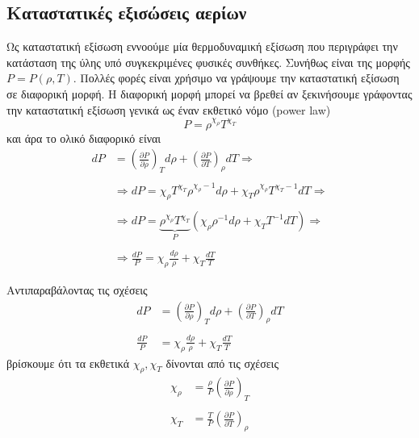 \subsection{Καταστατικές εξισώσεις αερίων}
Ως καταστατική εξίσωση εννοούμε μία θερμοδυναμική εξίσωση που περιγράφει την κατάσταση της ύλης υπό συγκεκριμένες φυσικές συνθήκες. Συνήθως είναι της μορφής $P = P(\rho, T)$. Πολλές φορές είναι χρήσιμο να γράψουμε την καταστατική εξίσωση σε διαφορική μορφή. Η διαφορική μορφή μπορεί να βρεθεί αν ξεκινήσουμε γράφοντας την καταστατική εξίσωση γενικά ως έναν εκθετικό νόμο (power law)
\begin{equation}
    P = \rho^{\chi_\rho} T^{\chi_T}
\end{equation}
και άρα το ολικό διαφορικό είναι
\begin{align}
    \nonumber dP &= \left( \frac{\partial P}{\partial \rho} \right)_T d\rho + \left( \frac{\partial P}{\partial T} \right)_\rho dT \Rightarrow \\\nonumber\\
    \nonumber &\Rightarrow dP = \chi_\rho T^{\chi_T} \rho^{\chi_\rho - 1} d\rho +  \chi_T \rho^{\chi_\rho} T^{\chi_T - 1} dT \Rightarrow \\\nonumber\\
    \nonumber &\Rightarrow dP = \underbrace{\rho^{\chi_\rho} T^{\chi_T}}_{P} \left(\chi_\rho \rho^{-1} d\rho + \chi_T T^{-1} dT \right) \Rightarrow \\\nonumber\\
    &\Rightarrow \boxed{\frac{dP}{P} = \chi_\rho \frac{d\rho}{\rho} + \chi_T \frac{dT}{T}}
\end{align}

Αντιπαραβάλοντας τις σχέσεις
\begin{align*}
    \label{apx:eq:differential_form_of_eos}
    dP &= \left( \frac{\partial P}{\partial \rho} \right)_T d\rho + \left( \frac{\partial P}{\partial T} \right)_\rho dT \\\\
    \frac{dP}{P} &= \chi_\rho \frac{d\rho}{\rho} + \chi_T \frac{dT}{T}
\end{align*}
βρίσκουμε ότι τα εκθετικά $\chi_\rho, \chi_T$ δίνονται από τις σχέσεις
\begin{align*}
    \chi_\rho &= \frac{\rho}{P} \left( \frac{\partial P}{\partial \rho} \right)_T \\\\
    \chi_T &= \frac{T}{P} \left( \frac{\partial P}{\partial T} \right)_\rho
\end{align*}

